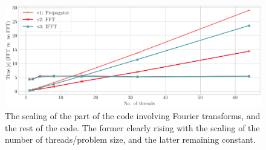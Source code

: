 \documentclass{article}
\begin{document}
\begin{figure}
    \centering
    \includegraphics[width=\textwidth]{./figures/FFT_scaling.pdf}
    \caption{The scaling of the part of the code involving Fourier transforms, and the rest of the code. The former clearly rising with the scaling of the number of threads/problem size, and the latter remaining constant.}
    \label{fig:fft_scaling}
\end{figure}
\FloatBarrier
\appendix
\end{document}
